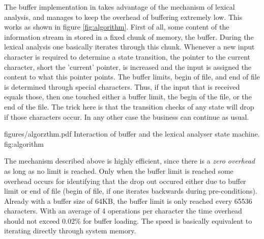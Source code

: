 The buffer implementation in {\quex} takes advantage of the mechanism of
lexical analysis, and manages to keep the overhead of buffering extremely low.
This works as shown in figure \ref{fig:algorithm}. First of all, some content of the
information stream in stored in a fixed chunk of memory, the buffer. During the
lexical analysis one basically iterates through this chunk. Whenever a new
input character is required to determine a state transition, the pointer to the
current character, short the 'current' pointer, is increased and the input is
assigned the content to what this pointer points. The buffer limits, begin of
file, and end of file is determined through special characters.  Thus, if the
input that is received equals those, then one touched either a buffer limit,
the begin of the file, or the end of the file. The trick here is that the
transition checks of any state will drop if those characters occur. In
any other case the business can continue as usual.

\showpic
{figures/algorzthm.pdf}
{Interaction of buffer and the lexical analyser state machine.}
{fig:algorithm}

The mechanism described above is highly efficient, since there is a {\it zero
overhead} as long as no limit is reached. Only when the buffer limit is reached
some overhead occurs for identifying that the drop out occured either due to
buffer limit or end of file (begin of file, if one iterates backwards during
	pre-conditions).  Already with a buffer size of 64KB, the buffer limit
is only reached every 65536 characters.  With an average of 4 operations per
character the time overhead should not exceed 0.02\% for buffer loading.  The
speed is basically equivalent to iterating directly through system memory.

